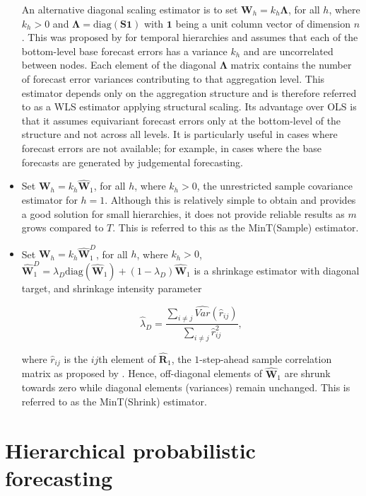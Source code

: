 \documentclass[graybox]{svmult}
\begin{document}
\begin{itemize}
        An alternative diagonal scaling estimator is to set $\bm{W}_{h}=k_{h}\bm{\Lambda}$, for all $h$, where $k_{h} > 0$ and $\bm{\Lambda}=\text{diag}(\bm{S}\bm{1})$ with $\bm{1}$ being a unit column vector of dimension $n$. This was proposed by \citet{AthEtAl2017} for temporal hierarchies and assumes that each of the bottom-level base forecast errors has a variance $k_{h}$ and are uncorrelated between nodes. Each element of the diagonal $\bm{\Lambda}$ matrix contains the number of forecast error variances contributing to that aggregation level. This estimator depends only on the aggregation structure and is therefore referred to as a WLS estimator applying structural scaling. Its advantage over OLS is that it assumes equivariant forecast errors only at the bottom-level of the structure and not across all levels. It is particularly useful in cases where forecast errors are not available; for example, in cases where the base forecasts are generated by judgemental forecasting.

    \item  Set $\bm{W}_{h}=k_{h}\hat{\bm{W}}_{1}$, for all $h$, where $k_{h} > 0$, the unrestricted sample covariance estimator for $h=1$. Although this is relatively simple to obtain and provides a good solution for small hierarchies, it does not provide reliable results as $m$ grows compared to $T$. This is referred to this as the MinT(Sample) estimator.
    \item Set $\bm{W}_{h}=k_{h}\hat{\bm{W}}_{1}^D$, for all $h$, where $k_{h} > 0$, $\hat{\bm{W}}^{D}_{1} = \lambda_{D} \text{diag}(\hat{\bm{W}}_{1}) + (1 - \lambda_{D})\hat{\bm{W}}_{1}$ is a shrinkage estimator with diagonal target, and shrinkage intensity parameter

        $$\hat{\lambda}_{D} = \frac{\sum_{i \ne j}\hat{Var}(\hat{r}_{ij})}{\sum_{i \ne j}\hat{r}_{ij}^2},$$


        where $\hat{r}_{ij}$ is the $ij$th element of $\hat{\bm{R}}_{1}$, the $1$-step-ahead sample correlation matrix as proposed by \citet{Schafer2005}. Hence, off-diagonal elements of $\hat{\bm{W}}_1$ are shrunk towards zero while diagonal elements (variances) remain unchanged. This is referred to as the MinT(Shrink) estimator.
\end{itemize}

\clearpage
\section{Hierarchical probabilistic forecasting}
\end{document}
